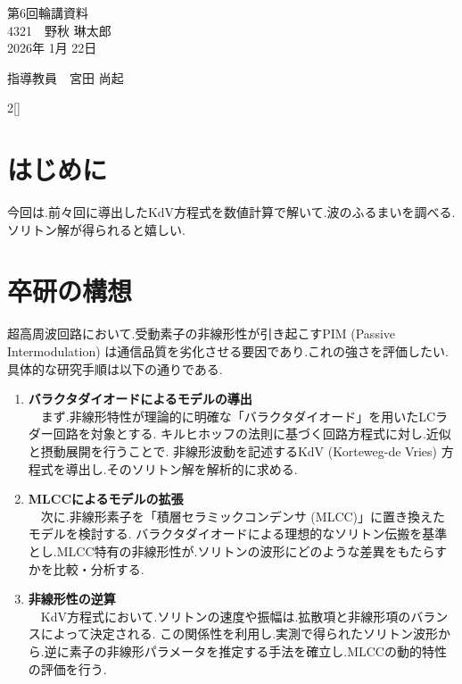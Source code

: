 \documentclass[a4paper,10pt]{article}
\begin{document}
\begin{center}
\noindent
{\LARGE 第6回輪講資料} \\
{\large 4321　野秋 琳太郎} \\
2026年 1月 22日
\end{center}

\begin{flushright}
指導教員　宮田 尚起
\end{flushright}    

\begin{multicols}{2}[\raggedcolumns]
\section{はじめに}
今回は.前々回に導出したKdV方程式を数値計算で解いて.波のふるまいを調べる.
ソリトン解が得られると嬉しい.

\section{卒研の構想}
超高周波回路において.受動素子の非線形性が引き起こすPIM (Passive Intermodulation) は通信品質を劣化させる要因であり.これの強さを評価したい.
具体的な研究手順は以下の通りである.

\begin{enumerate}
    \item \textbf{バラクタダイオードによるモデルの導出} \\
    　まず.非線形特性が理論的に明確な「バラクタダイオード」を用いたLCラダー回路を対象とする.
    キルヒホッフの法則に基づく回路方程式に対し.近似と摂動展開を行うことで.
    非線形波動を記述するKdV (Korteweg-de Vries) 方程式を導出し.そのソリトン解を解析的に求める.

    \item \textbf{MLCCによるモデルの拡張} \\
    　次に.非線形素子を「積層セラミックコンデンサ (MLCC)」に置き換えたモデルを検討する.
    バラクタダイオードによる理想的なソリトン伝搬を基準とし.MLCC特有の非線形性が.ソリトンの波形にどのような差異をもたらすかを比較・分析する.

    \item \textbf{非線形性の逆算} \\
    　KdV方程式において.ソリトンの速度や振幅は.拡散項と非線形項のバランスによって決定される.
    この関係性を利用し.実測で得られたソリトン波形から.逆に素子の非線形パラメータを推定する手法を確立し.MLCCの動的特性の評価を行う.
\end{enumerate}


\end{multicols}
\end{document}
